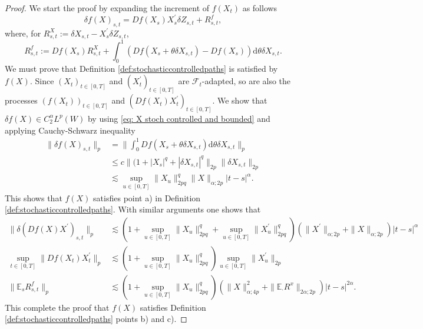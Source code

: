 \documentclass[11pt,a4paper]{article}
\newcommand{\rd}{\mathrm{d}}
\theoremstyle{plain}
\begin{document}
\begin{proof}
    We start the proof by expanding the increment of $f(X_t)$ as follows
    \begin{equation*}
        \delta f(X)_{s,t} = Df(X_s)X_s^{\prime} \delta Z_{s,t} + R^{f}_{s,t},
    \end{equation*}
    where, for $R^{X}_{s,t}:= \delta X_{s,t} - X^{\prime}_s \delta Z_{s,t}$,
    \begin{equation*}
        R^f_{s,t} := Df(X_s)R^{X}_{s,t}
        + \int_{0}^{1} \left(Df(X_s + \theta \delta X_{s,t}) - Df(X_s) \right) \rd \theta \delta X_{s,t}.
    \end{equation*}
    We must prove that Definition \ref{def:stochasticcontrolledpaths} is satisfied by $f(X)$. Since $(X_t)_{t\in[0,T]}$ and $(X^{\prime}_t)_{t\in[0,T]}$ are $\mathcal{F}_t$-adapted, so are also the processes $(f(X_t))_{t\in[0,T]}$ and $(Df(X_t)X^\prime_t)_{t\in [0,T]}$.
    We show that $\delta f(X) \in C^{\alpha}_2 L^p(W)$ by using \eqref{eq: X stoch controlled and bounded} and applying Cauchy-Schwarz inequality
    \begin{align*}
        \|\delta f(X)_{s,t} \|_{p}
        & = \| \int_0^1 Df(X_s+\theta \delta X_{s,t})\rd \theta \delta X_{s,t}\|_{p}\\
        & \leq c \|(1+|X_s|^q+|\delta X_{s,t}|^q \|_{{2p}}
        \| \delta X_{s,t} \|_{2p}\\
        & \lesssim \sup_{u\in[0,T]}\|X_u\|_{{2pq}}^q \|X\|_{\alpha;2p} |t-s|^{\alpha}.
    \end{align*}
    This shows that $f(X)$ satisfies point a) in Definition \ref{def:stochasticcontrolledpaths}.
    With similar arguments one shows that 
    \begin{align*}
        \| \delta(Df(X)X^\prime)_{s,t}
        \|_{p}
        & \lesssim (1+\sup_{u\in[0,T]}\|X_u\|_{{2pq}}^q + \sup_{u\in[0,T]}\|X^{\prime}_u\|_{{2pq}}^q)
        (\|X^{\prime}\|_{\alpha;2p} + \|X\|_{\alpha;2p}) |t-s|^{\alpha}\\
        \sup_{t\in[0,T]}\|Df(X_t)X^{\prime}_t\|_{p} 
        & \lesssim (1+\sup_{u\in[0,T]}\|X_u\|_{{2pq}}^q) \sup_{u\in[0,T]}\|X^{\prime}_u\|_{{2p}}\\
        \|\mathbb{E}_sR^f_{s,t}\|_{p} 
        &\lesssim (1+\sup_{u\in[0,T]}\|X_u\|_{{2pq}}^q)
        (\|X\|_{\alpha;4p}^2+ \|\mathbb{E}_{\cdot}R^x\|_{2\alpha;2p}) |t-s|^{2\alpha}.
    \end{align*}
    This complete the proof that $f(X)$ satisfies Definition \ref{def:stochasticcontrolledpaths} points b) and c).
\end{proof}
\end{document}
